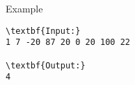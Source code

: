 Example
\begin{verbatim}
\textbf{Input:}
1 7 -20 87 20 0 20 100 22

\textbf{Output:}
4\end{verbatim}